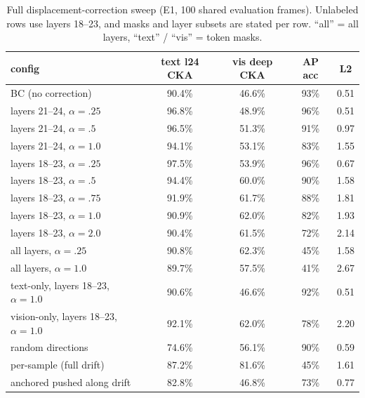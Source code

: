 \documentclass{article}
\begin{document}
\begin{table}[H]
	\centering
	\caption{Full displacement-correction sweep (E1, 100 shared evaluation frames). Unlabeled
	rows use layers 18--23, and masks and layer subsets are stated per row.
	``all'' = all layers, ``text'' / ``vis'' = token masks.}
	\label{tab:app_e1}
	\footnotesize
	\begin{tabular}{lcccc}
		\toprule
		config & text l24 CKA & vis deep CKA & AP acc & L2 \\
		\midrule
		BC (no correction)          & 90.4\% & 46.6\% & 93\% & 0.51 \\
		layers 21--24, $\alpha{=}.25$ & 96.8\% & 48.9\% & 96\% & 0.51 \\
		layers 21--24, $\alpha{=}.5$  & 96.5\% & 51.3\% & 91\% & 0.97 \\
		layers 21--24, $\alpha{=}1.0$ & 94.1\% & 53.1\% & 83\% & 1.55 \\
		layers 18--23, $\alpha{=}.25$ & 97.5\% & 53.9\% & 96\% & 0.67 \\
		layers 18--23, $\alpha{=}.5$  & 94.4\% & 60.0\% & 90\% & 1.58 \\
		layers 18--23, $\alpha{=}.75$ & 91.9\% & 61.7\% & 88\% & 1.81 \\
		layers 18--23, $\alpha{=}1.0$ & 90.9\% & 62.0\% & 82\% & 1.93 \\
		layers 18--23, $\alpha{=}2.0$ & 90.4\% & 61.5\% & 72\% & 2.14 \\
		all layers, $\alpha{=}.25$    & 90.8\% & 62.3\% & 45\% & 1.58 \\
		all layers, $\alpha{=}1.0$    & 89.7\% & 57.5\% & 41\% & 2.67 \\
		text-only, layers 18--23, $\alpha{=}1.0$ & 90.6\% & 46.6\% & 92\% & 0.51 \\
		vision-only, layers 18--23, $\alpha{=}1.0$ & 92.1\% & 62.0\% & 78\% & 2.20 \\
		random directions           & 74.6\% & 56.1\% & 90\% & 0.59 \\
		per-sample (full drift)     & 87.2\% & 81.6\% & 45\% & 1.61 \\
		anchored pushed along drift & 82.8\% & 46.8\% & 73\% & 0.77 \\
		\bottomrule
	\end{tabular}
\end{table}
\end{document}
